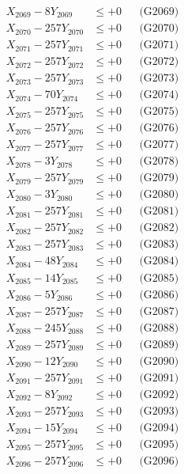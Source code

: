 \documentclass[a4paper,10pt]{article}
\begin{document}
{\begin{align}
X_{2069} - 8Y_{2069} &\leq +0 && \text{(G2069)} \\
X_{2070} - 257Y_{2070} &\leq +0 && \text{(G2070)} \\
\allowbreak
X_{2071} - 257Y_{2071} &\leq +0 && \text{(G2071)} \\
X_{2072} - 257Y_{2072} &\leq +0 && \text{(G2072)} \\
X_{2073} - 257Y_{2073} &\leq +0 && \text{(G2073)} \\
X_{2074} - 70Y_{2074} &\leq +0 && \text{(G2074)} \\
X_{2075} - 257Y_{2075} &\leq +0 && \text{(G2075)} \\
X_{2076} - 257Y_{2076} &\leq +0 && \text{(G2076)} \\
X_{2077} - 257Y_{2077} &\leq +0 && \text{(G2077)} \\
X_{2078} - 3Y_{2078} &\leq +0 && \text{(G2078)} \\
X_{2079} - 257Y_{2079} &\leq +0 && \text{(G2079)} \\
X_{2080} - 3Y_{2080} &\leq +0 && \text{(G2080)} \\
\allowbreak
X_{2081} - 257Y_{2081} &\leq +0 && \text{(G2081)} \\
X_{2082} - 257Y_{2082} &\leq +0 && \text{(G2082)} \\
X_{2083} - 257Y_{2083} &\leq +0 && \text{(G2083)} \\
X_{2084} - 48Y_{2084} &\leq +0 && \text{(G2084)} \\
X_{2085} - 14Y_{2085} &\leq +0 && \text{(G2085)} \\
X_{2086} - 5Y_{2086} &\leq +0 && \text{(G2086)} \\
X_{2087} - 257Y_{2087} &\leq +0 && \text{(G2087)} \\
X_{2088} - 245Y_{2088} &\leq +0 && \text{(G2088)} \\
X_{2089} - 257Y_{2089} &\leq +0 && \text{(G2089)} \\
X_{2090} - 12Y_{2090} &\leq +0 && \text{(G2090)} \\
\allowbreak
X_{2091} - 257Y_{2091} &\leq +0 && \text{(G2091)} \\
X_{2092} - 8Y_{2092} &\leq +0 && \text{(G2092)} \\
X_{2093} - 257Y_{2093} &\leq +0 && \text{(G2093)} \\
X_{2094} - 15Y_{2094} &\leq +0 && \text{(G2094)} \\
X_{2095} - 257Y_{2095} &\leq +0 && \text{(G2095)} \\
X_{2096} - 257Y_{2096} &\leq +0 && \text{(G2096)} \\

\end{align}}
\end{document}
